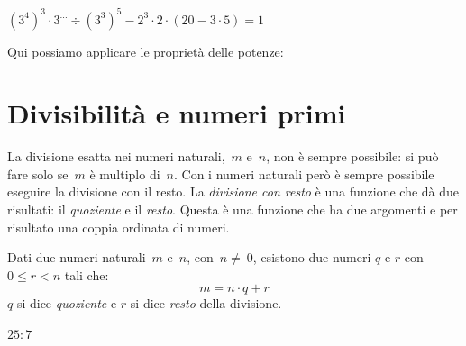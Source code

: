 
\begin{esempio}{}{}
\quad \(\left(3^4 \right)^3 \cdot 3^{\dots} \div \left(3^3 \right)^5 -
  2^{3} \cdot 2 \cdot \left( 20 - 3 \cdot 5 \right) = 1\)

Qui possiamo applicare le proprietà delle potenze:

\end{esempio}

\section{Divisibilità e numeri primi}
\label{sec:nat_divsibilita}

La divisione esatta nei numeri naturali,~\(m\) e~\(n\), non è sempre 
possibile: si può fare solo se~\(m\) è multiplo di~\(n\).
Con i numeri naturali però è sempre possibile eseguire la divisione con il 
resto. La \emph{divisione con resto} è una funzione che dà due risultati:
il \emph{quoziente} e il \emph{resto}. 
Questa è una funzione che ha due argomenti e per risultato una coppia 
ordinata di numeri.

\begin{definizione}{}{}
 Dati due numeri naturali~\(m\) e~\(n\), con~\(n\neq~0\), 
 esistono due numeri \(q\) e \(r\) con \(0 \leqslant r < n\) 
 tali che: 
 \[m = n \cdot q + r\] 
 \(q\) si dice \emph{quoziente} e \(r\) si dice \emph{resto} della divisione.
\end{definizione}

\begin{esempio}{}{} \(25:7\)

\end{esempio}

